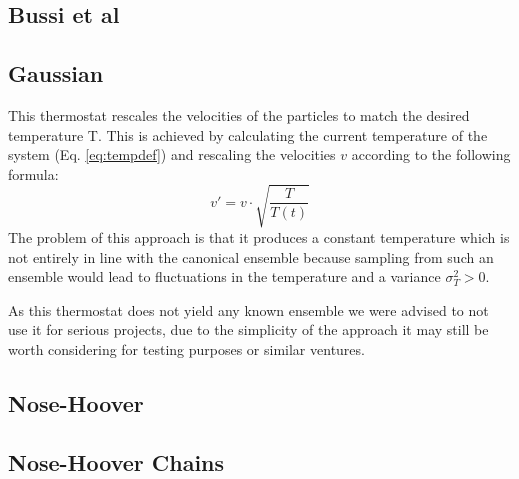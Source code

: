 \subsection{Bussi et al}
\subsection{Gaussian}
This thermostat rescales the velocities of the particles to match the desired temperature T. This is achieved by calculating the current temperature of the system (Eq. \eqref{eq:tempdef}) and rescaling the velocities $v$ according to the following formula:
\begin{equation*}
v'  = v\cdot \sqrt{\frac{T}{T(t)}}
\end{equation*}
The problem of this approach is that it produces a constant temperature which is not entirely in line with the canonical ensemble because sampling from such an ensemble would lead to fluctuations in the temperature and a variance $\sigma_T^2 > 0$.

As this thermostat does not yield any known ensemble we were advised to not use it for serious projects, due to the simplicity of the approach it may still be worth considering for testing purposes or similar ventures.


\subsection{Nose-Hoover}
\subsection{Nose-Hoover Chains}


